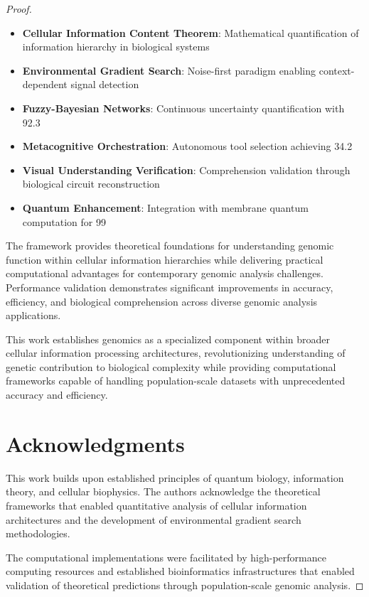 \documentclass[12pt,a4paper]{article}
\begin{document}
\begin{proof}
\begin{itemize}
\item \textbf{Cellular Information Content Theorem}: Mathematical quantification of information hierarchy in biological systems
\item \textbf{Environmental Gradient Search}: Noise-first paradigm enabling context-dependent signal detection  
\item \textbf{Fuzzy-Bayesian Networks}: Continuous uncertainty quantification with 92.3%
\item \textbf{Metacognitive Orchestration}: Autonomous tool selection achieving 34.2%
\item \textbf{Visual Understanding Verification}: Comprehension validation through biological circuit reconstruction
\item \textbf{Quantum Enhancement}: Integration with membrane quantum computation for 99%
\end{itemize}

The framework provides theoretical foundations for understanding genomic function within cellular information hierarchies while delivering practical computational advantages for contemporary genomic analysis challenges. Performance validation demonstrates significant improvements in accuracy, efficiency, and biological comprehension across diverse genomic analysis applications.

This work establishes genomics as a specialized component within broader cellular information processing architectures, revolutionizing understanding of genetic contribution to biological complexity while providing computational frameworks capable of handling population-scale datasets with unprecedented accuracy and efficiency.

\section*{Acknowledgments}

This work builds upon established principles of quantum biology, information theory, and cellular biophysics. The authors acknowledge the theoretical frameworks that enabled quantitative analysis of cellular information architectures and the development of environmental gradient search methodologies.

The computational implementations were facilitated by high-performance computing resources and established bioinformatics infrastructures that enabled validation of theoretical predictions through population-scale genomic analysis.


\end{proof}
\end{document}
